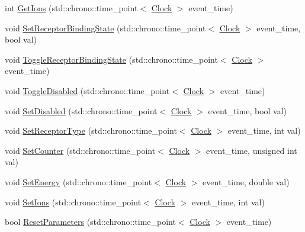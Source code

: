 \begin{DoxyCompactItemize}
\item 
int \hyperlink{class_neuroreceptor_a69103180d9b335b9504b4ae3c203d0ea}{Get\+Ions} (std\+::chrono\+::time\+\_\+point$<$ \hyperlink{universe_8h_a0ef8d951d1ca5ab3cfaf7ab4c7a6fd80}{Clock} $>$ event\+\_\+time)
\item 
void \hyperlink{class_neuroreceptor_a75adddd7e615af57b8f3f841ec25463c}{Set\+Receptor\+Binding\+State} (std\+::chrono\+::time\+\_\+point$<$ \hyperlink{universe_8h_a0ef8d951d1ca5ab3cfaf7ab4c7a6fd80}{Clock} $>$ event\+\_\+time, bool val)
\item 
void \hyperlink{class_neuroreceptor_ace41227d30a8f50e1a6efadc86573f80}{Toggle\+Receptor\+Binding\+State} (std\+::chrono\+::time\+\_\+point$<$ \hyperlink{universe_8h_a0ef8d951d1ca5ab3cfaf7ab4c7a6fd80}{Clock} $>$ event\+\_\+time)
\item 
void \hyperlink{class_neuroreceptor_a8a339a4d0f150bbdfbc2650155625196}{Toggle\+Disabled} (std\+::chrono\+::time\+\_\+point$<$ \hyperlink{universe_8h_a0ef8d951d1ca5ab3cfaf7ab4c7a6fd80}{Clock} $>$ event\+\_\+time)
\item 
void \hyperlink{class_neuroreceptor_aeec8bb2442e04700d4e9d80bb2d6e47e}{Set\+Disabled} (std\+::chrono\+::time\+\_\+point$<$ \hyperlink{universe_8h_a0ef8d951d1ca5ab3cfaf7ab4c7a6fd80}{Clock} $>$ event\+\_\+time, bool val)
\item 
void \hyperlink{class_neuroreceptor_a0e6e88d6c5b357872f055edbddb54d4c}{Set\+Receptor\+Type} (std\+::chrono\+::time\+\_\+point$<$ \hyperlink{universe_8h_a0ef8d951d1ca5ab3cfaf7ab4c7a6fd80}{Clock} $>$ event\+\_\+time, int val)
\item 
void \hyperlink{class_neuroreceptor_a0660a316ef44cf723509f720acd16f24}{Set\+Counter} (std\+::chrono\+::time\+\_\+point$<$ \hyperlink{universe_8h_a0ef8d951d1ca5ab3cfaf7ab4c7a6fd80}{Clock} $>$ event\+\_\+time, unsigned int val)
\item 
void \hyperlink{class_neuroreceptor_ac1189f9c40e3cd07e4b1dc11115ad882}{Set\+Energy} (std\+::chrono\+::time\+\_\+point$<$ \hyperlink{universe_8h_a0ef8d951d1ca5ab3cfaf7ab4c7a6fd80}{Clock} $>$ event\+\_\+time, double val)
\item 
void \hyperlink{class_neuroreceptor_a36a548475e752631130a2b4ec67c66b6}{Set\+Ions} (std\+::chrono\+::time\+\_\+point$<$ \hyperlink{universe_8h_a0ef8d951d1ca5ab3cfaf7ab4c7a6fd80}{Clock} $>$ event\+\_\+time, int val)
\item 
bool \hyperlink{class_neuroreceptor_a30debeb0311d92eb6abe354409c15d09}{Reset\+Parameters} (std\+::chrono\+::time\+\_\+point$<$ \hyperlink{universe_8h_a0ef8d951d1ca5ab3cfaf7ab4c7a6fd80}{Clock} $>$ event\+\_\+time)

\end{DoxyCompactItemize}
